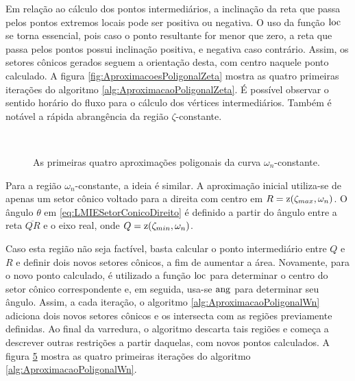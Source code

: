 Em relação ao cálculo dos pontos intermediários, a inclinação da reta que passa pelos pontos extremos locais pode ser positiva ou negativa. O uso da função $\operatorname{loc}$ se torna essencial, pois caso o ponto resultante for menor que zero, a reta que passa pelos pontos possui inclinação positiva, e negativa caso contrário\cite{WISNIEWSKI2019}. Assim, os setores cônicos gerados seguem a orientação desta, com centro naquele ponto calculado. A figura \ref{fig:AproximacoesPoligonalZeta} mostra as quatro primeiras iterações do algoritmo \ref{alg:AproximacaoPoligonalZeta}. É possível observar o sentido horário do fluxo para o cálculo dos vértices intermediários. Também é notável a rápida abrangência da região $\zeta$-constante.

\begin{figure}[!ht]
\centering
\begin{subfigure}[t]{0.4\columnwidth}

\caption{}
\label{subfig:AproximacaoPoligonalWn1}
\end{subfigure}
\begin{subfigure}[t]{0.4\columnwidth}

\caption{}
\label{subfig:AproximacaoPoligonalWn2}
\end{subfigure}
\\
\begin{subfigure}[t]{0.4\columnwidth}

\caption{}
\label{subfig:AproximacaoPoligonalWn3}
\end{subfigure}
\begin{subfigure}[t]{0.4\columnwidth}

\caption{}
\label{subfig:AproximacaoPoligonalWn4}
\end{subfigure}
\caption{As primeiras quatro aproximações poligonais da curva $\omega_n$-constante.}
\label{fig:AproximacoesPoligonalWn}
\end{figure}

Para a região $\omega_n$-constante, a ideia é similar. A aproximação inicial utiliza-se de apenas um setor cônico voltado para a direita com centro em $R = \operatorname{\mathrm{z}}(\zeta_{max},\omega_n)$. O ângulo $\theta$ em \eqref{eq:LMIESetorConicoDireito} é definido a partir do ângulo entre a reta $\overline{QR}$ e o eixo real, onde $Q = \operatorname{\mathrm{z}}(\zeta_{min},\omega_n)$.

Caso esta região não seja factível, basta calcular o ponto intermediário entre $Q$ e $R$ e definir dois novos setores cônicos, a fim de aumentar a área. Novamente, para o novo ponto calculado, é utilizado a função $\operatorname{loc}$ para determinar o centro do setor cônico correspondente e, em seguida, usa-se $\operatorname{ang}$ para determinar seu ângulo. Assim, a cada iteração, o algoritmo \ref{alg:AproximacaoPoligonalWn} adiciona dois novos setores cônicos e os intersecta com as regiões previamente definidas. Ao final da varredura, o algoritmo descarta tais regiões e começa a descrever outras restrições a partir daquelas, com novos pontos calculados. A figura \ref{fig:AproximacoesPoligonalWn} mostra as quatro primeiras iterações do algoritmo \ref{alg:AproximacaoPoligonalWn}.

